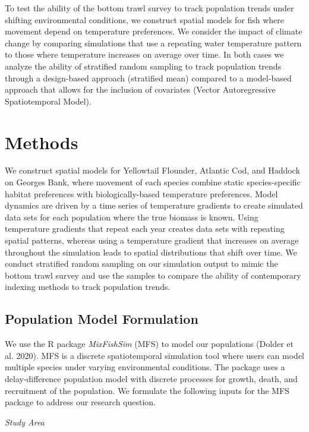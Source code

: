 \documentclass[
  12pt,
]{article}
\begin{document}
To test the ability of the bottom trawl survey to track population trends under shifting environmental conditions, we construct spatial models for fish where movement depend on temperature preferences. We consider the impact of climate change by comparing simulations that use a repeating water temperature pattern to those where temperature increases on average over time. In both cases we analyze the ability of stratified random sampling to track population trends through a design-based approach (stratified mean) compared to a model-based approach that allows for the inclusion of covariates (Vector Autoregressive Spatiotemporal Model).

\section{Methods}

We construct spatial models for Yellowtail Flounder, Atlantic Cod, and Haddock on Georges Bank, where movement of each species combine static species-specific habitat preferences with biologically-based temperature preferences. Model dynamics are driven by a time series of temperature gradients to create simulated data sets for each population where the true biomass is known. Using temperature gradients that repeat each year creates data sets with repeating spatial patterns, whereas using a temperature gradient that increases on average throughout the simulation leads to spatial distributions that shift over time. We conduct stratified random sampling on our simulation output to mimic the bottom trawl survey and use the samples to compare the ability of contemporary indexing methods to track population trends.

\subsection{Population Model Formulation}

We use the R package \emph{MixFishSim} (MFS) to model our populations (Dolder et al. 2020). MFS is a discrete spatiotemporal simulation tool where users can model multiple species under varying environmental conditions. The package uses a delay-difference population model with discrete processes for growth, death, and recruitment of the population. We formulate the following inputs for the MFS package to address our research question.

\emph{Study Area}
\end{document}
